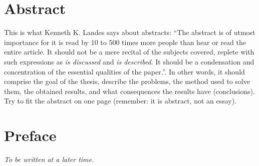 \documentclass[
10pt, %
a4paper, %
oneside, %
headinclude,footinclude, %
] {book}%
\begin{document}

\chapter*{Abstract}

This is what Kenneth K. Landes says about abstracts: ``The abstract is
of utmost importance for it is read by 10 to 500 times more people
than hear or read the entire article. It should not be a mere recital
of the subjects covered, replete with such expressions as \textit{is
  discussed} and \textit{is described}. It should be a condensation
and concentration of the essential qualities of the paper.''. In other
words, it should comprise the goal of the thesis, describe the problems, the
method used to solve them, the obtained results, and what consequences
the results have (conclusions). Try to fit the abstract on one page (remember: it is abstract, not an essay).


\clearpage
\setcounter{tocdepth}{3} %
\tableofcontents %







\chapter*{Preface}

\textit{To be written at a later time.}
\end{document}
